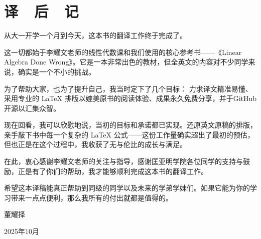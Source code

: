 

\chapter{译~~后~~记}

从大一开学一个月到今天，这本书的翻译工作终于完成了。

这一切都始于李耀文老师的线性代数课和我们使用的核心参考书——《Linear Algebra Done Wrong》。它是一本非常出色的教材，但全英文的内容对不少同学来说，确实是一个不小的挑战。

为了帮助大家，也为了提升自己，我当时定下了几个目标：
力求译文精准易懂、采用专业的 \LaTeX{} 排版以媲美原书的阅读体验、成果永久免费分享，并于GitHub开源以汇集众智。

现在回看，我可以欣慰地说，当初的目标和承诺都已实现。还原英文原稿的排版，亲手敲下书中每一个复杂的 \LaTeX{} 公式——这份工作量确实超出了最初的预估，但也正是在这个过程中，我收获了无与伦比的成长与满足。


在此，衷心感谢李耀文老师的关注与指导，感谢匡亚明学院各位同学的支持与鼓励，正是有了你们的帮助，我才能够顺利完成这本书的翻译工作。

希望这本译稿能真正帮助到同级的同学以及未来的学弟学妹们。如果它能为你的学习带来一点点便利，那么我所有的付出就都是值得的。




\vspace{5ex}
\begin{flushright}
董耀择~~~~~~~~~

2025年10月~~~~~
\end{flushright}

